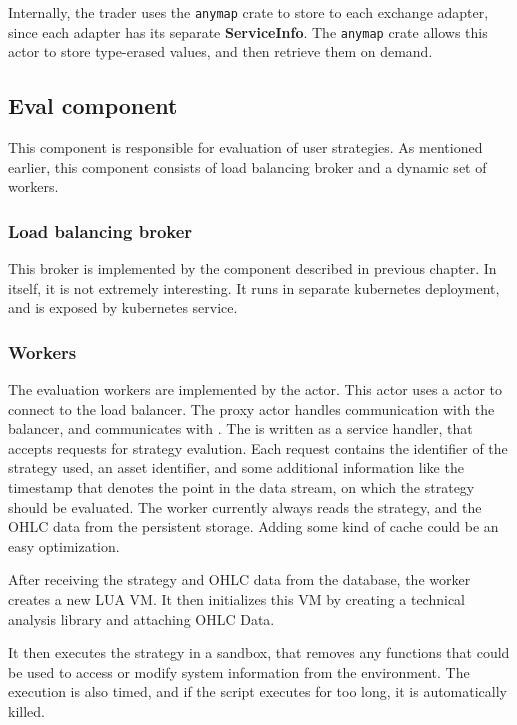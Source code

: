 Internally, the trader uses the \verb|anymap| crate to store  to each exchange
adapter, since each adapter has its separate \textbf{ServiceInfo}. The \verb|anymap| crate allows
this actor to store type-erased values, and then retrieve them on demand.

\subsection{Eval component}
This component is responsible for evaluation of user strategies. As mentioned earlier, this component consists
of load balancing broker and a dynamic set of workers.

\subsubsection{Load balancing broker}
This broker is implemented by the  component described in previous chapter. In itself,
it is not extremely interesting. It runs in separate kubernetes deployment, and is exposed by kubernetes service.

\subsubsection{Workers}
The evaluation workers are implemented by the  actor. This actor uses a 
actor to connect to the load balancer. The proxy actor handles communication with the balancer, and
communicates with . The  is written as a service handler, that accepts requests
for strategy evalution. Each request contains the identifier of the strategy used, an asset identifier,
and some additional information like the timestamp that denotes the point in the data stream, on which
the strategy should be evaluated. The worker currently always reads the strategy, and the OHLC data from the
persistent storage. Adding some kind of cache could be an easy optimization.

After receiving the strategy and OHLC data from the database, the worker creates a new LUA VM. It then
initializes this VM by creating a technical analysis library and attaching OHLC Data.

It then executes the strategy in a sandbox, that removes any functions that could be used to access or modify
system information from the environment. The execution is also timed, and if the script executes for too long, it is
automatically killed.

